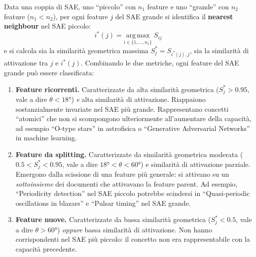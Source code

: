 Data una coppia di SAE, uno ``piccolo'' con $n_1$ feature e uno ``grande'' con $n_2$ feature ($n_1 < n_2$), per ogni feature $j$ del SAE grande si identifica il \textbf{nearest neighbour} nel SAE piccolo:
\begin{equation}
    i^*(j) = \underset{i \in \{1,\dots,n_1\}}{\mathrm{arg\,max}} \; S_{ij}
    \label{eq:nearest_neighbour}
\end{equation}
e si calcola sia la similarità geometrica massima $S^*_j = S_{i^*(j), j}$, sia la similarità di attivazione tra $j$ e $i^*(j)$. Combinando le due metriche, ogni feature del SAE grande può essere classificata:

\begin{enumerate}
    \item \textbf{Feature ricorrenti.} Caratterizzate da alta similarità geometrica ($S^*_j > 0.95$, vale a dire $\theta < 18°$) \textit{e} alta similarità di attivazione. Riappaiono sostanzialmente invariate nel SAE più grande. Rappresentano concetti ``atomici'' che non si scompongono ulteriormente all'aumentare della capacità, ad esempio ``O-type stars'' in astrofisica o ``Generative Adversarial Networks'' in machine learning.
    
    \item \textbf{Feature da splitting.} Caratterizzate da similarità geometrica moderata ($0.5 < S^*_j < 0.95$, vale a dire $18° < \theta < 60°$) e similarità di attivazione parziale. Emergono dalla scissione di una feature più generale: si attivano su un \textit{sottoinsieme} dei documenti che attivavano la feature parent. Ad esempio, ``Periodicity detection'' nel SAE piccolo potrebbe scindersi in ``Quasi-periodic oscillations in blazars'' e ``Pulsar timing'' nel SAE grande.
    
    \item \textbf{Feature nuove.} Caratterizzate da bassa similarità geometrica ($S^*_j < 0.5$, vale a dire $\theta > 60°$) \textit{oppure} bassa similarità di attivazione. Non hanno corrispondenti nel SAE più piccolo: il concetto non era rappresentabile con la capacità precedente.
\end{enumerate}

